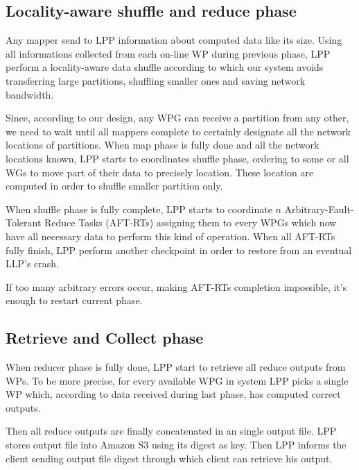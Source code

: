 \documentclass[sigchi]{acmart}
\begin{document}
\subsection{Locality-aware shuffle and reduce phase}

Any mapper send to LPP information about computed data like its size. Using all informations collected from each on-line WP during previous phase, LPP perform a locality-aware data shuffle according to which our system avoids transferring large partitions, shuffling smaller ones and saving network bandwidth.

Since, according to our design, any WPG can receive a partition from any other, we need to wait until all mappers complete to certainly designate all the network locations of partitions. When map phase is fully done and all the network locations known, LPP starts to coordinates shuffle phase, ordering to some or all WGs to move part of their data to precisely location. These location are computed in order to shuffle smaller partition only. 

When shuffle phase is fully complete, LPP starts to coordinate $n$ Arbitrary-Fault-Tolerant Reduce Tasks (AFT-RTs) assigning them to every WPGs which now have all necessary data to perform this kind of operation. When all AFT-RTs fully finish, LPP perform another checkpoint in order to restore from an eventual LLP's crash.

If too many arbitrary errors occur, making AFT-RTs completion impossible, it's enough to restart current phase.

\subsection{Retrieve and Collect phase}

When reducer phase is fully done, LPP start to retrieve all reduce outputs from WPs. To be more precise, for every available WPG in system LPP picks a single WP which, according to data received during last phase, has computed correct outputs.

Then all reduce outputs are finally concatenated in an single output file. LPP stores output file into Amazon S3 using its digest as key. Then LPP informs the client sending output file digest through which client can retrieve his output.






\appendix
\end{document}
